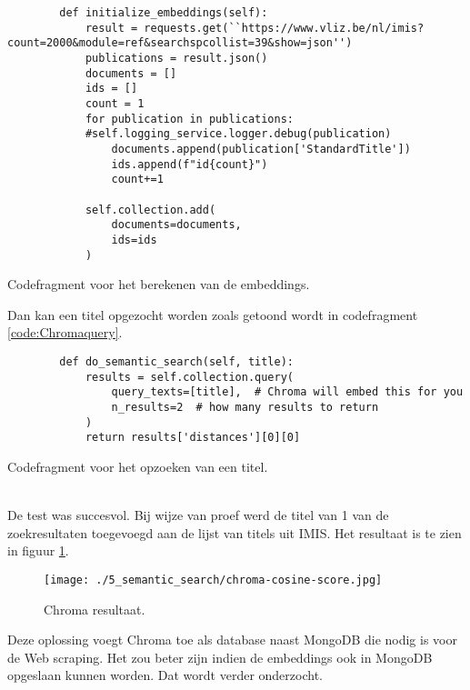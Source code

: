 \begin{listing}
    \begin{verbatim}
        def initialize_embeddings(self):
            result = requests.get(``https://www.vliz.be/nl/imis?count=2000&module=ref&searchspcollist=39&show=json'')
            publications = result.json()
            documents = []
            ids = []
            count = 1
            for publication in publications:
            #self.logging_service.logger.debug(publication)
                documents.append(publication['StandardTitle'])
                ids.append(f"id{count}")
                count+=1
        
            self.collection.add(
                documents=documents,
                ids=ids
            )
    \end{verbatim}
    \caption[Embeddings codefragment]{Codefragment voor het berekenen van de embeddings.}
    \label{code:Chromaembeddings}
\end{listing}
Dan kan een titel opgezocht worden zoals getoond wordt in codefragment \ref{code:Chromaquery}.
\begin{listing}
    \begin{verbatim}
        def do_semantic_search(self, title):
            results = self.collection.query(
                query_texts=[title],  # Chroma will embed this for you
                n_results=2  # how many results to return
            )
            return results['distances'][0][0]
    \end{verbatim}
    \caption[Query codefragment]{Codefragment voor het opzoeken van een titel.}
    \label{code:Chromaquery}
\end{listing}
\\
De test was succesvol. Bij wijze van proef werd de titel van 1 van de zoekresultaten toegevoegd aan de lijst van titels uit IMIS. Het resultaat is te zien in figuur \ref{fig:Chroma}.
\begin{figure}
    \centering
    \texttt{[image: ./5\_semantic\_search/chroma-cosine-score.jpg]}
    \caption[Chroma resultaat.]{\label{fig:Chroma}Chroma resultaat.}
\end{figure}
Deze oplossing voegt Chroma toe als database naast MongoDB die nodig is voor de Web scraping. Het zou beter zijn indien de embeddings ook in MongoDB opgeslaan kunnen worden. Dat wordt verder onderzocht.
